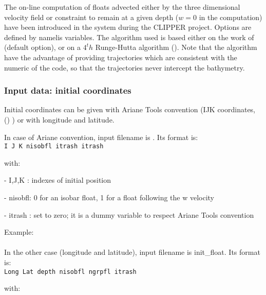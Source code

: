 \documentclass[../tex_main/NEMO_manual]{subfiles}
\begin{document}
The on-line computation of floats advected either by the three dimensional velocity field or 
constraint to remain at a given depth ($w = 0$ in the computation) have been introduced in 
the system during the CLIPPER project.
Options are defined by  namelis variables.
The algorithm used is based either on the work of \cite{Blanke_Raynaud_JPO97} (default option), or 
on a $4^th$ Runge-Hutta algorithm ().
Note that the \cite{Blanke_Raynaud_JPO97} algorithm have the advantage of providing trajectories which 
are consistent with the numeric of the code, so that the trajectories never intercept the bathymetry.

\subsubsection{Input data: initial coordinates}

Initial coordinates can be given with Ariane Tools convention (IJK coordinates,
() ) or with longitude and latitude.

In case of Ariane convention, input filename is .
Its format is: \\
{\scriptsize \texttt{I J K nisobfl itrash itrash}}

\noindent with:

 - I,J,K  : indexes of initial position

 - nisobfl: 0 for an isobar float, 1 for a float following the w velocity  

 - itrash : set to zero; it is a dummy variable to respect Ariane Tools convention

\noindent Example: \\
 \\

In the other case (longitude and latitude), input filename is init\_float.
Its format is: \\
{\scriptsize \texttt{Long Lat depth nisobfl ngrpfl itrash}}

\noindent with:
\end{document}
